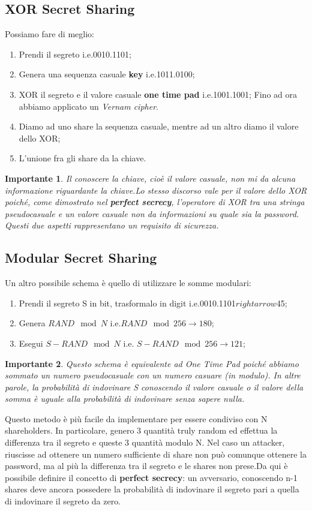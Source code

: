 \documentclass{book}
\newtheorem*{Importante}{\textbf{Importante}}
\begin{document}
\subsection{XOR Secret Sharing}
Possiamo fare di meglio:\begin{enumerate}
    \item Prendi il segreto i.e.0010.1101;
    \item Genera una sequenza casuale \textbf{key} i.e.1011.0100;
    \item XOR il segreto e il valore casuale \textbf{one time pad} i.e.1001.1001;\newline
          Fino ad ora abbiamo applicato un \emph{Vernam cipher}\@.
    \item Diamo ad uno share la sequenza casuale, mentre ad un altro diamo il valore dello XOR;\@
    \item L'unione fra gli share da la chiave\@.
\end{enumerate}
\begin{Importante}
    Il conoscere la chiave, cioè il valore casuale, non mi da alcuna informazione riguardante la chiave\@.\newline Lo stesso discorso vale per il valore dello XOR poiché, come dimostrato nel \textbf{perfect secrecy}, l'operatore di XOR tra una stringa pseudocasuale e un valore casuale non da informazioni su quale sia la password\@.\newline
    Questi due aspetti rappresentano un requisito di sicurezza\@.
\end{Importante}
\newpage
\subsection{Modular Secret Sharing}
Un altro possibile schema è quello di utilizzare le somme modulari:\begin{enumerate}
    \item Prendi il segreto S in bit, trasformalo in digit i.e.0010.1101\(rightarrow\)45;
    \item Genera \(RAND\mod{N}\) i.e.\(RAND\mod{256} \rightarrow  180\);
    \item Esegui \(S-RAND\mod{N}\) i.e. \(S-RAND\mod{256}\rightarrow  121\);
\end{enumerate}
\begin{Importante}
    Questo schema è equivalente ad One Time Pad poiché abbiamo sommato un numero pseudocasuale con un numero casuare (in modulo)\@. In altre parole, la probabilità di indovinare S conoscendo il valore casuale o il valore della somma è uguale alla probabilità di indovinare senza sapere nulla\@.
\end{Importante}
Questo metodo è più facile da implementare per essere condiviso con N shareholders\@. In particolare, genero 3 quantità truly random ed effettua la differenza tra il segreto e queste 3 quantità modulo N\@.
Nel caso un attacker, riuscisse ad ottenere un numero sufficiente di share non può comunque ottenere la password, ma al più la differenza tra il segreto e le shares non prese\@.\newline Da qui è possibile definire il concetto di \textbf{perfect secrecy}: un avversario, conoscendo n-1 shares deve ancora possedere la probabilità di indovinare il segreto pari a quella di indovinare il segreto da zero\@.
\end{document}
